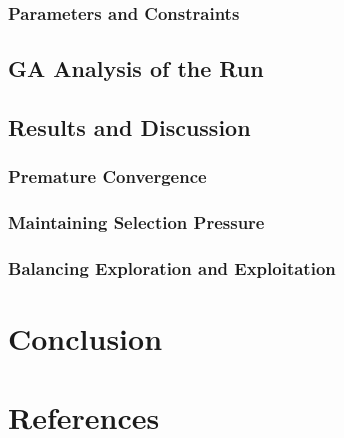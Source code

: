 \documentclass[conference]{inc/IEEEtran}
\begin{document}
\subsubsection{Parameters and Constraints}
\subsection{GA Analysis of the Run}


\subsection{Results and Discussion}

\subsubsection{Premature Convergence}

\subsubsection{Maintaining Selection Pressure}

\subsubsection{Balancing Exploration and Exploitation}

\section{Conclusion}

\section*{References}




\end{document}
